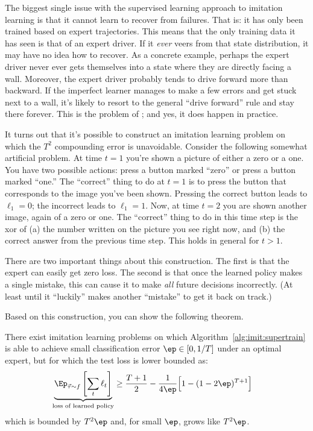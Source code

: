 The biggest single issue with the supervised learning approach to imitation learning is that it cannot learn to recover from failures.
That is: it has only been trained based on expert trajectories.
This means that the only training data it has seen is that of an expert driver.
If it \emph{ever} veers from that state distribution, it may have no idea how to recover.
As a concrete example, perhaps the expert driver never ever gets themselves into a state where they are directly facing a wall.
Moreover, the expert driver probably tends to drive forward more than backward.
If the imperfect learner manages to make a few errors and get stuck next to a wall, it's likely to resort to the general ``drive forward'' rule and stay there forever.
This is the problem of ;
and yes, it does happen in practice.

It turns out that it's possible to construct an imitation learning problem on which the $T^2$ compounding error is unavoidable.
Consider the following somewhat artificial problem.
At time $t=1$ you're shown a picture of either a zero or a one.
You have two possible actions: press a button marked ``zero'' or press a button marked ``one.''
The ``correct'' thing to do at $t=1$ is to press the button that corresponds to the image you've been shown.
Pressing the correct button leads to $\ell_1=0$; the incorrect leads to $\ell_1=1$.
Now, at time $t=2$ you are shown another image, again of a zero or one.
The ``correct'' thing to do in this time step is the xor of (a) the number written on the picture you see right now, and (b) the correct answer from the previous time step.
This holds in general for $t>1$.

There are two important things about this construction.
The first is that the expert can easily get zero loss.
The second is that once the learned policy makes a single mistake, this can cause it to make \emph{all} future decisions incorrectly.
(At least until it ``luckily'' makes another ``mistake'' to get it back on track.)

Based on this construction, you can show the following theorem.

\begin{theorem}
  There exist imitation learning problems on which Algorithm~\ref{alg:imit:supertrain} is able to achieve small classification error $\ep \in [0,1/T]$ under an optimal expert, but for which the test loss is lower bounded as:
  \begin{align}
    \underbrace{\Ep_{\vt \sim f}\left[\sum_t \ell_t\right]}_{\text{loss of learned policy}}
    & \geq
    \frac {T + 1} 2 - \frac 1 {4\ep} \Big[ 1 - (1-2\ep)^{T+1} \Big]
  \end{align}
  which is bounded by $T^2 \ep$ and, for small $\ep$, grows like $T^2 \ep$.
\end{theorem}

